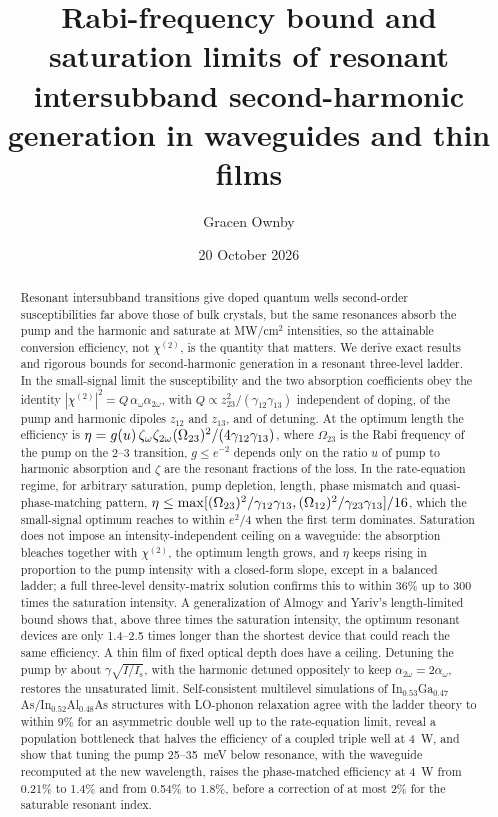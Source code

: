 \documentclass[11pt]{article}
\title{Rabi-frequency bound and saturation limits of resonant intersubband second-harmonic generation in waveguides and thin films}
\author{Gracen Ownby}
\affil{University of Oklahoma, Norman, Oklahoma, USA}
\date{\small 20 October 2026}
\newcommand{\chitwo}{\chi^{(2)}}
\newcommand{\aw}{\alpha_{\omega}}
\newcommand{\aww}{\alpha_{2\omega}}
\newcommand{\Is}{I_\mathrm{s}}
\let\hbar\relax\DeclareRobustCommand{\hbar}{{\mathchar'26\mkern-9mu h}}
\begin{document}
\maketitle

\begin{abstract}
Resonant intersubband transitions give doped quantum wells second-order susceptibilities far above those of bulk crystals, but the same resonances absorb the pump and the harmonic and saturate at MW/cm$^2$ intensities, so the attainable conversion efficiency, not $\chitwo$, is the quantity that matters. We derive exact results and rigorous bounds for second-harmonic generation in a resonant three-level ladder. In the small-signal limit the susceptibility and the two absorption coefficients obey the identity $|\chitwo|^2=Q\,\aw\aww$, with $Q\propto z_{23}^2/(\gamma_{12}\gamma_{13})$ independent of doping, of the pump and harmonic dipoles $z_{12}$ and $z_{13}$, and of detuning. At the optimum length the efficiency is $\eta=g(u)\,\zeta_\omega\zeta_{2\omega}(\hbar\Omega_{23})^2/(4\gamma_{12}\gamma_{13})$, where $\Omega_{23}$ is the Rabi frequency of the pump on the 2--3 transition, $g\le e^{-2}$ depends only on the ratio $u$ of pump to harmonic absorption and $\zeta$ are the resonant fractions of the loss. In the rate-equation regime, for arbitrary saturation, pump depletion, length, phase mismatch and quasi-phase-matching pattern, $\eta\le\max[(\hbar\Omega_{23})^2/\gamma_{12}\gamma_{13},(\hbar\Omega_{12})^2/\gamma_{23}\gamma_{13}]/16$, which the small-signal optimum reaches to within $e^2/4$ when the first term dominates. Saturation does not impose an intensity-independent ceiling on a waveguide: the absorption bleaches together with $\chitwo$, the optimum length grows, and $\eta$ keeps rising in proportion to the pump intensity with a closed-form slope, except in a balanced ladder; a full three-level density-matrix solution confirms this to within 36\% up to 300 times the saturation intensity. A generalization of Almogy and Yariv's length-limited bound shows that, above three times the saturation intensity, the optimum resonant devices are only 1.4--2.5 times longer than the shortest device that could reach the same efficiency. A thin film of fixed optical depth does have a ceiling. Detuning the pump by about $\gamma\sqrt{I/\Is}$, with the harmonic detuned oppositely to keep $\aww=2\aw$, restores the unsaturated limit. Self-consistent multilevel simulations of In$_{0.53}$Ga$_{0.47}$As/In$_{0.52}$Al$_{0.48}$As structures with LO-phonon relaxation agree with the ladder theory to within 9\% for an asymmetric double well up to the rate-equation limit, reveal a population bottleneck that halves the efficiency of a coupled triple well at 4~W, and show that tuning the pump 25--35~meV below resonance, with the waveguide recomputed at the new wavelength, raises the phase-matched efficiency at 4~W from 0.21\% to 1.4\% and from 0.54\% to 1.8\%, before a correction of at most 2\% for the saturable resonant index.
\end{abstract}
\end{document}
